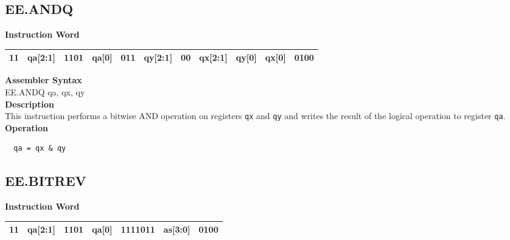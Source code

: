 \subsection{EE.ANDQ}\label{instruction:EEANDQ}
\setlength\tabcolsep{6pt}
\textbf{Instruction Word} \\
\begin{tabular}{|c|c|c|c|c|c|c|c|c|c|c|}
	\hline
	11 & qa[2:1] & 1101 & qa[0] & 011 & qy[2:1] & 00 & qx[2:1] & qy[0] & qx[0] & 0100 \\
	\hline
\end{tabular}

\textbf{Assembler Syntax} \\
EE.ANDQ qa, qx, qy \\
\textbf{Description} \\
This instruction performs a bitwise AND operation on registers \lstinline{qx} and \lstinline{qy} and writes the result of the logical operation to register \lstinline{qa}.\\
\textbf{Operation}
\begin{lstlisting}
  qa = qx & qy
\end{lstlisting}

\clearpage
\subsection{EE.BITREV}\label{instruction:EEBITREV}
\setlength\tabcolsep{6pt}
\textbf{Instruction Word} \\
\begin{tabular}{|c|c|c|c|c|c|c|}
	\hline
	11 & qa[2:1] & 1101 & qa[0] & 1111011 & as[3:0] & 0100 \\
	\hline
\end{tabular}

